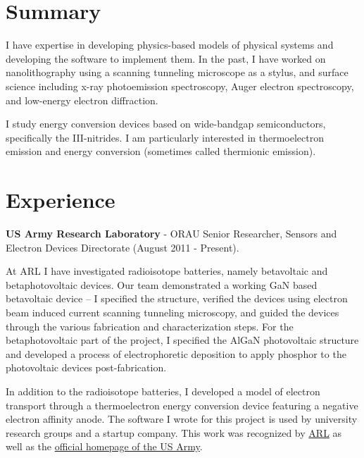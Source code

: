 

\section{Summary}

I have expertise in developing physics-based models of physical systems
and developing the software to implement them. In the past, I have
worked on nanolithography using a scanning tunneling microscope as a
stylus, and surface science including x-ray photoemission spectroscopy,
Auger electron spectroscopy, and low-energy electron diffraction.

I study energy conversion devices based on wide-bandgap semiconductors,
specifically the III-nitrides. I am particularly interested in
thermoelectron emission and energy conversion (sometimes called
thermionic emission).

\section{Experience}

\textbf{US Army Research Laboratory} - ORAU Senior Researcher, Sensors
and Electron Devices Directorate (August 2011 - Present).

At ARL I have investigated radioisotope batteries, namely betavoltaic
and betaphotovoltaic devices. Our team demonstrated a working GaN based
betavoltaic device -- I specified the structure, verified the devices
using electron beam induced current scanning tunneling microscopy, and
guided the devices through the various fabrication and characterization
steps. For the betaphotovoltaic part of the project, I specified the
AlGaN photovoltaic structure and developed a process of electrophoretic
deposition to apply phosphor to the photovoltaic devices
post-fabrication.

In addition to the radioisotope batteries, I developed a model of
electron transport through a thermoelectron energy conversion device
featuring a negative electron affinity anode. The software I wrote for
this project is used by university research groups and a startup
company. This work was recognized by
\href{http://www.arl.army.mil/www/default.cfm?article=2462}{ARL} as well
as the
\href{http://www.army.mil/article/123473/Visiting_Army_scientist_makes_discoveries_in_emerging_technology/}{official
homepage of the US Army}.

